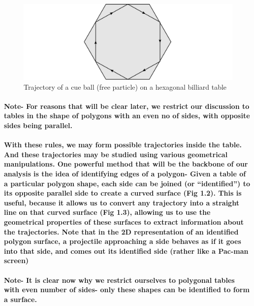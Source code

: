\documentclass{report}
\begin{document}
\begin{center}
\begin{figure} 
\includegraphics[scale=0.3]{1}
\caption{Trajectory of a cue ball (free particle) on a hexagonal billiard table}
\end{figure}
\end{center}


\paragraph{Note- For reasons that will be clear later, we restrict our discussion to tables in the shape of polygons with an even no of sides, with opposite sides being parallel.}
 
\paragraph{With these rules, we may form possible trajectories inside the table. And these trajectories may be studied using various geometrical manipulations. One powerful method that will be the backbone of our analysis is the idea of identifying edges of a polygon- Given a table of a particular polygon shape, each side can be joined (or “identified”) to its opposite parallel side to create a curved surface (Fig 1.2). This is useful, because it allows us to convert any trajectory into a straight line on that curved surface (Fig 1.3), allowing us to use the geometrical properties of these surfaces to extract information about the trajectories. Note that in the 2D representation of an identified polygon surface, a projectile approaching a side behaves as if it goes into that side, and comes out its identified side (rather like a Pac-man screen)}

\paragraph{Note- It is clear now why we restrict ourselves to polygonal tables with even number of sides- only these shapes can be identified to form a surface.}
\end{document}
